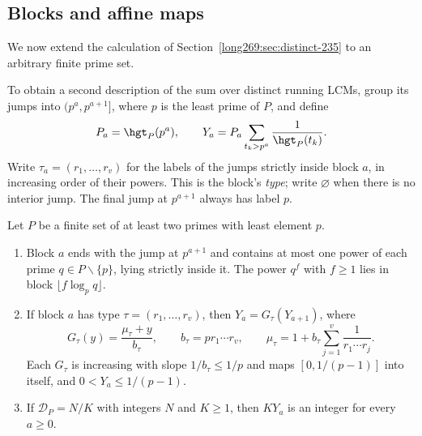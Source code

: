 \subsection{Blocks and affine maps}\label{long269:sec:distinct-blocks}
We now extend the calculation of Section~\ref{long269:sec:distinct-235}
to an arbitrary finite prime set.

To obtain a second description of the sum over distinct running LCMs, group its jumps
into $(p^a,p^{a+1}]$, where $p$ is the least prime of $P$, and define
\[
 P_a=\hgt_P(p^a),\qquad
 Y_a=P_a\sum_{t_k>p^a}\frac1{\hgt_P(t_k)}.
\]
Write $\tau_a=(r_1,\ldots,r_v)$ for the labels of the jumps strictly
inside block $a$, in increasing order of their powers. This is the block's
\emph{type}; write $\varnothing$ when there is no interior jump.
The final jump at $p^{a+1}$ always has label $p$.

\begin{remark}\label{long269:res:distinct-height-blocks}
Let $P$ be a finite set of at least two primes with least element $p$.
\begin{enumerate}[label=\textup{(\roman*)}]
\item Block $a$ ends with the jump at $p^{a+1}$ and contains at most one
power of each prime $q\in P\smallsetminus\{p\}$, lying strictly inside it.  The
power $q^f$ with $f\ge1$ lies in block $\lfloor f\log_pq\rfloor$.
\item If block $a$ has type $\tau=(r_1,\ldots,r_v)$, then
$Y_a=G_\tau(Y_{a+1})$, where
\[
 G_\tau(y)=\frac{\mu_\tau+y}{b_\tau},\qquad b_\tau=pr_1\cdots r_v,\qquad
 \mu_\tau=1+b_\tau\sum_{j=1}^{v}\frac1{r_1\cdots r_j}.
\]
Each $G_\tau$ is increasing with slope $1/b_\tau\le1/p$ and maps
$[0,1/(p-1)]$ into itself, and $0<Y_a\le1/(p-1)$.
\item If $\mathcal D_P=N/K$ with integers $N$ and $K\ge1$, then $KY_a$ is
an integer for every $a\ge0$.
\end{enumerate}
\end{remark}


